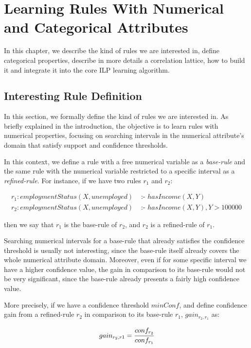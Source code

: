 \chapter{Learning Rules With Numerical and Categorical Attributes}
\label{cl:intro}

In this chapter, we describe the kind of rules we are interested in, define categorical properties,
describe in more details a correlation lattice, how to build it and integrate it into the core ILP learning
algorithm.

\section{Interesting Rule Definition}

In this section, we formally define the kind of rules we are interested in. As briefly explained in the introduction,
the objective is to learn rules with numerical properties, focusing on searching intervals in the numerical attribute's
domain that satisfy support and confidence thresholds.

In this context, we define a rule with a free numerical variable as a \emph{base-rule} and the same rule with the
numerical variable restricted to a specific interval as a \emph{refined-rule}. For instance, if we have
two rules $r_1$ and $r_2$:

\begin{align*}
r_1: employmentStatus(X,unemployed)&\text{ :- }hasIncome(X,Y) \\
r_2: employmentStatus(X,unemployed)&\text{ :- }hasIncome(X,Y),Y>100000
\end{align*}

then we say that $r_1$ is the base-rule of $r_2$, and $r_2$ is a refined-rule of $r_1$.

Searching numerical intervals for a base-rule that already satisfies the confidence threshold is usually not
interesting, since the base-rule itself already covers the whole numerical attribute
domain. Moreover, even if for some specific interval we have a higher confidence value, the gain in comparison to
its base-rule would not be very significant, since the base-rule already presents a fairly high confidence value.

More precisely, if we have a confidence threshold $minConf$, and define confidence gain from a refined-rule
$r_2$ in comparison to its base-rule $r_1$, $gain_{r_2,r_1}$ as:

\begin{equation}
 gain_{r_2,r1}=\cfrac{conf_{r_2}}{conf_{r_1}}
\label{eq:gain}
\end{equation}

